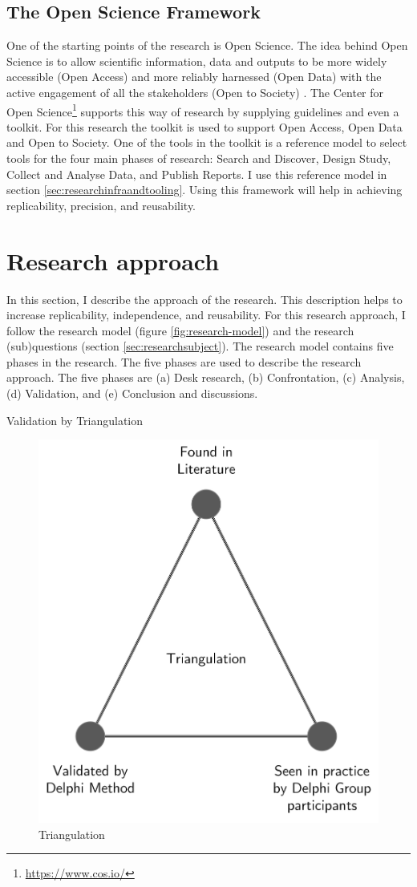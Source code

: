 \subsection{The Open Science Framework}
\label{sub:osf}
One of the starting points of the research is Open Science. The idea behind Open Science is to allow scientific information, data and outputs to be more widely accessible (Open Access) and more reliably harnessed (Open Data) with the active engagement of all the stakeholders (Open to Society) \parencite{UNESCO2020}. The Center for Open Science\footnote{{\url{https://www.cos.io/}}} supports this way of research by supplying guidelines and even a toolkit. For this research the toolkit is used to support Open Access, Open Data and Open to Society. One of the tools in the toolkit is a reference model to select tools for the four main phases of research: Search and Discover, Design Study, Collect and Analyse Data, and Publish Reports. I use this reference model in section \ref{sec:researchinfraandtooling}. Using this framework will help in achieving replicability, precision, and reusability.
\section{Research approach}
\label{sec:researchapproach}
In this section, I describe the approach of the research. This description helps to increase replicability, independence, and reusability. For this research approach, I follow the research model (figure \ref{fig:research-model}) and the research (sub)questions (section \ref{sec:researchsubject}). The research model contains five phases in the research. The five phases are used to describe the research approach. The five phases are (a) Desk research, (b) Confrontation, (c) Analysis, (d) Validation, and (e) Conclusion and discussions.

Validation by Triangulation

\begin{figure}[H]
	\centering
	\includegraphics[width=0.6\linewidth]{images/triangulation}
	\caption[Triangulation]{Triangulation}
	\label{fig:triangulation}
\end{figure}

